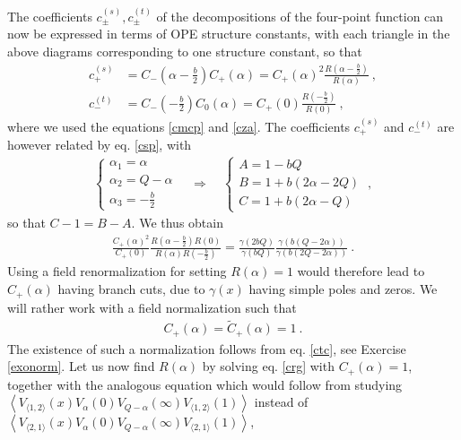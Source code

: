\documentclass[12pt,a4paper,notitlepage]{report}
\numberwithin{equation}{section}
\theoremstyle{break}
\begin{document}
The coefficients $c^{(s)}_\pm,c^{(t)}_\pm$ of the decompositions of the four-point function can now be expressed in terms of OPE structure constants, with each triangle in the above diagrams corresponding to one structure constant, so that 
\begin{align}
 c^{(s)}_+ &= C_-(\alpha-\tfrac{b}{2})C_+(\alpha) = C_+(\alpha)^2 \frac{R(\alpha-\tfrac{b}{2})}{R(\alpha)}\ ,
\\
c^{(t)}_- & = C_-(-\tfrac{b}{2}) C_0(\alpha)= C_+(0)\frac{R(-\tfrac{b}{2})}{R(0)}\ ,
\end{align}
where we used the equations \eqref{cmcp} and \eqref{cza}.
The coefficients $c^{(s)}_+$ and $c^{(t)}_-$ are however related by eq. \eqref{csp}, with
\begin{align}
 \left\{\begin{array}{l}  \alpha_1 = \alpha \\ \alpha_2 = Q-\alpha \\ \alpha_3 = -\frac{b}{2} \end{array}\right. \quad \Rightarrow \quad \left\{\begin{array}{l}  A = 1-bQ \\ B = 1+b(2\alpha-2Q) \\ C=1+b(2\alpha-Q) \end{array}\right.  \ ,
\end{align}
so that $C-1=B-A$.
We thus obtain
\begin{align}
 \frac{C_+(\alpha)^2}{C_+(0)} \frac{R(\alpha-\tfrac{b}{2})R(0)}{R(\alpha)R(-\tfrac{b}{2})} = 
\frac{\gamma(2bQ)}{\gamma(bQ)} \frac{\gamma(b(Q-2\alpha))}{\gamma(b(2Q-2\alpha))}\ .
\label{crg}
\end{align}
Using a field renormalization for setting $R(\alpha)=1$ would therefore lead to $C_+(\alpha)$ having branch cuts, due to $\gamma(x)$ having simple poles and zeros.
We will rather work with a field normalization such that  
\begin{align}
 \boxed{C_+(\alpha) = \tilde{C}_+(\alpha) = 1}\ . 
\label{cco}
\end{align}
The existence of such a normalization follows from eq. \eqref{ctc}, see Exercise \ref{exonorm}.
Let us now find $R(\alpha)$ by solving eq. \eqref{crg} with $C_+(\alpha)=1$, together with the analogous equation which would follow from studying $ \left\langle V_{\langle 1,2 \rangle}(x) V_\alpha(0) V_{Q-\alpha}(\infty) V_{\langle 1,2 \rangle}(1)\right\rangle$ instead of $\left\langle V_{\langle 2,1 \rangle}(x) V_\alpha(0) V_{Q-\alpha}(\infty) V_{\langle 2,1 \rangle}(1)\right\rangle$, 
\end{document}
